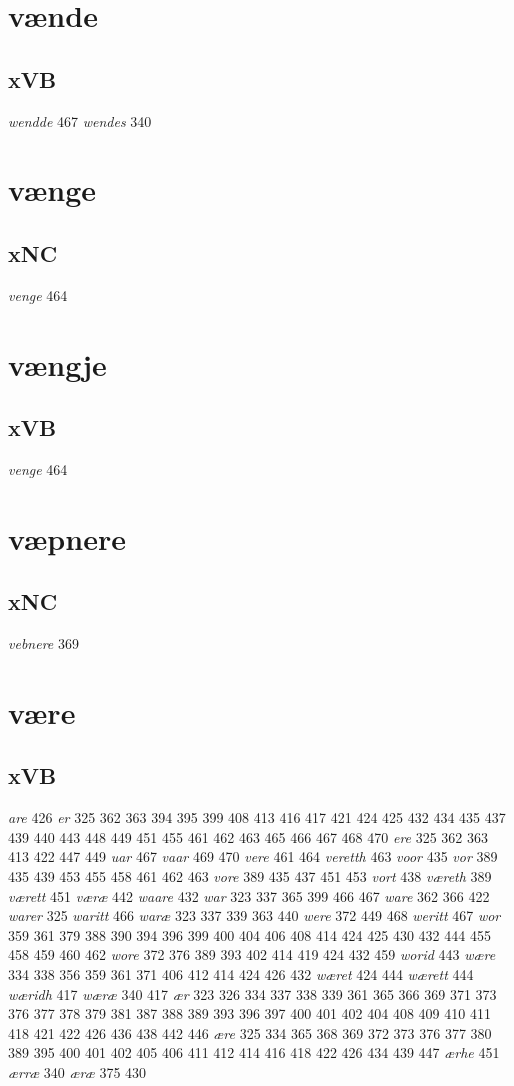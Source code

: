 \documentclass[a4paper,twocolumn]{article}
\begin{document}
\section{vænde}
\label{sec:org5303b74}
\subsection{xVB}
\label{sec:orgaf6a06a}
\emph{wendde} 467 \emph{wendes} 340 
\section{vænge}
\label{sec:org0afbf35}
\subsection{xNC}
\label{sec:orgf1c7ddb}
\emph{venge} 464 
\section{vængje}
\label{sec:org83f6836}
\subsection{xVB}
\label{sec:org1ca02ca}
\emph{venge} 464 
\section{væpnere}
\label{sec:org6cf39eb}
\subsection{xNC}
\label{sec:org337c6c2}
\emph{vebnere} 369 
\section{være}
\label{sec:orgeac710a}
\subsection{xVB}
\label{sec:org929b550}
\emph{are} 426 \emph{er} 325 362 363 394 395 399 408 413 416 417 421 424 425 432 434 435 437 439 440 443 448 449 451 455 461 462 463 465 466 467 468 470 \emph{ere} 325 362 363 413 422 447 449 \emph{uar} 467 \emph{vaar} 469 470 \emph{vere} 461 464 \emph{veretth} 463 \emph{voor} 435 \emph{vor} 389 435 439 453 455 458 461 462 463 \emph{vore} 389 435 437 451 453 \emph{vort} 438 \emph{væreth} 389 \emph{værett} 451 \emph{væræ} 442 \emph{waare} 432 \emph{war} 323 337 365 399 466 467 \emph{ware} 362 366 422 \emph{warer} 325 \emph{waritt} 466 \emph{waræ} 323 337 339 363 440 \emph{were} 372 449 468 \emph{weritt} 467 \emph{wor} 359 361 379 388 390 394 396 399 400 404 406 408 414 424 425 430 432 444 455 458 459 460 462 \emph{wore} 372 376 389 393 402 414 419 424 432 459 \emph{worid} 443 \emph{wære} 334 338 356 359 361 371 406 412 414 424 426 432 \emph{wæret} 424 444 \emph{wærett} 444 \emph{wæridh} 417 \emph{wæræ} 340 417 \emph{ær} 323 326 334 337 338 339 361 365 366 369 371 373 376 377 378 379 381 387 388 389 393 396 397 400 401 402 404 408 409 410 411 418 421 422 426 436 438 442 446 \emph{ære} 325 334 365 368 369 372 373 376 377 380 389 395 400 401 402 405 406 411 412 414 416 418 422 426 434 439 447 \emph{ærhe} 451 \emph{ærræ} 340 \emph{æræ} 375 430 
\end{document}
